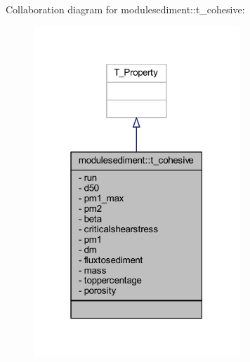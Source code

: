 Collaboration diagram for modulesediment\+:\+:t\+\_\+cohesive\+:\nopagebreak
\begin{figure}[H]
\begin{center}
\leavevmode
\includegraphics[width=220pt]{structmodulesediment_1_1t__cohesive__coll__graph}
\end{center}
\end{figure}
